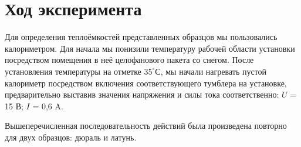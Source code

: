 \documentclass[a4paper,12pt]{article}
\begin{document}
\section{Ход эксперимента}
\hspace{\parindent}Для определения теплоёмкостей представленных образцов мы пользовались калориметром. Для начала мы понизили температуру рабочей области установки посредством помещения в неё целофанового пакета со снегом. После установления температуры на отметке $35^\circ С$, мы начали нагревать пустой калориметр посредством включения соответствующего тумблера на установке, предварительно выставив значения напряжения и силы тока соответственно: $U$ = 15 В; $I$ = 0,6 A.

Вышеперечисленная последовательность действий была произведена повторно для двух образцов: дюраль и латунь.
\begin{center}
\end{center}
\end{document}
